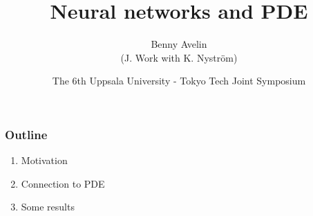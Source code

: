 \documentclass[10pt,handout]{beamer}
\def \englishtitle {Neural networks and PDE}
\begin{document}
\title{\englishtitle}
\author[Avelin]{Benny Avelin \\
	(J. Work with K. Nyström)}
\date[Uppsala-Tokyo Tech] %
{The 6th Uppsala University - Tokyo Tech Joint Symposium}

\begin{frame} %
\titlepage
\end{frame}

\begin{frame} %
	\frametitle{Outline}
	\begin{enumerate}
		\item Motivation
		\item Connection to PDE
		\item Some results
	\end{enumerate}
\end{frame}
\end{document}
